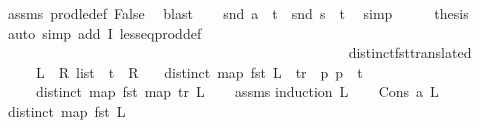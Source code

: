 \begin{isabellebody}
\ assms\ prod{\isacharunderscore}{\kern0pt}le{\isacharunderscore}{\kern0pt}def\ False\ \isamarkupfalse%
\ blast\isanewline
\ \ \isamarkupfalse%
\ {\isachardoublequoteopen}snd\ {\isacharparenleft}{\kern0pt}a\ {\isacharplus}{\kern0pt}\ t{\isacharparenright}{\kern0pt}\ {\isasymle}\ snd\ {\isacharparenleft}{\kern0pt}s\ {\isacharplus}{\kern0pt}\ t{\isacharparenright}{\kern0pt}{\isachardoublequoteclose}\ \isamarkupfalse%
\ simp\isanewline
\ \ \isamarkupfalse%
\ \isamarkupfalse%
\ {\isacharquery}{\kern0pt}thesis\isanewline
\ \ \ \ \isamarkupfalse%
\ {\isacharparenleft}{\kern0pt}auto\ simp\ add{\isacharcolon}{\kern0pt}\ I{}\ less{\isacharunderscore}{\kern0pt}eq{\isacharunderscore}{\kern0pt}prod{\isacharunderscore}{\kern0pt}def{\isacharparenright}{\kern0pt}\isanewline
{}\isamarkupfalse%
%
\endisatagproof
{\isafoldproof}%
%
\isadelimproof
\ \ \ \ \ \ \ \ \ \ \ \ \ \ \ \ \ \ \ \ \ \ \ \ \ \ \ \ \ \ \ \ \ \ \ \ \ \ \ \ \ \ \ \ \ \ \ \ \isanewline
%
\endisadelimproof
\isanewline
\isanewline
{}\isamarkupfalse%
\ distinct{\isacharunderscore}{\kern0pt}fst{\isacharunderscore}{\kern0pt}translated{\isacharcolon}{\kern0pt}\isanewline
\ \ \ \ \ L\ {\isacharcolon}{\kern0pt}{\isacharcolon}{\kern0pt}\ {\isachardoublequoteopen}R{}\ list{\isachardoublequoteclose}\ \ t\ {\isacharcolon}{\kern0pt}{\isacharcolon}{\kern0pt}\ R{}\isanewline
\ \ \ {\isachardoublequoteopen}distinct\ {\isacharparenleft}{\kern0pt}map\ fst\ L{\isacharparenright}{\kern0pt}{\isachardoublequoteclose}\ \ {\isachardoublequoteopen}tr\ {\isasymequiv}\ {\isacharparenleft}{\kern0pt}{\isasymlambda}p{\isachardot}{\kern0pt}\ p\ {\isacharplus}{\kern0pt}\ t{\isacharparenright}{\kern0pt}{\isachardoublequoteclose}\isanewline
\ \ \ \ \ {\isachardoublequoteopen}distinct\ {\isacharparenleft}{\kern0pt}map\ fst\ {\isacharparenleft}{\kern0pt}map\ tr\ L{\isacharparenright}{\kern0pt}{\isacharparenright}{\kern0pt}{\isachardoublequoteclose}\isanewline
%
\isadelimproof
\ \ %
\endisadelimproof
%
\isatagproof
{}\isamarkupfalse%
\ assms\isanewline
{}\isamarkupfalse%
{\isacharparenleft}{\kern0pt}induction\ L{\isacharparenright}{\kern0pt}\isanewline
\ \ \isamarkupfalse%
\ {\isacharparenleft}{\kern0pt}Cons\ a\ L{\isacharparenright}{\kern0pt}\isanewline
\ \ \isamarkupfalse%
\ {\isachardoublequoteopen}distinct\ {\isacharparenleft}{\kern0pt}map\ fst\ L{\isacharparenright}{\kern0pt}{\isachardoublequoteclose}\isanewline

\end{isabellebody}
